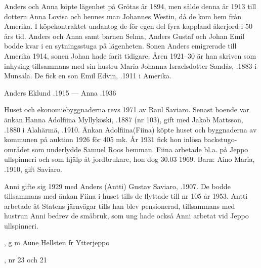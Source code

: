 Anders och Anna köpte lägenhet på Grötas år 1894, men sålde denna år 1913 till dottern Anna Lovisa och hennes man Johannes Westin, då de kom hem från Amerika. I köpekontraktet undantog de för egen del fyra kappland åkerjord i 50 års tid. Anders och Anna samt barnen Selma, Anders Gustaf och Johan Emil bodde kvar i en sytningsstuga på lägenheten. Sonen Anders emigrerade till Amerika 1914, sonen Johan hade farit tidigare. Åren 1921–30 är han skriven som inhysing tillsammans med sin hustru Maria Johanna Israelsdotter Sandås, .1883 i Munsala. De fick en son Emil Edvin, .1911 i Amerika.

Anders Eklund .1915  ---  Anna .1936



%



%
Huset och ekonomiebyggnaderna revs 1971 av Raul Saviaro. Senast boende var änkan Hanna Adolfiina Myllykoski, .1887 (nr 103), gift med Jakob Mattsson, .1880 i Alahärmä, .1910. Änkan Adolfiina(Fiina) köpte huset och byggnaderna av kommunen på auktion 1926 för 405 mk. År 1931 fick hon inlösa backstugo-området som underlydde Samuel Roos hemman. Fiina arbetade bl.a. på Jeppo ullspinneri och som hjälp åt jordbrukare, hon dog 30.03 1969.  Barn:  Aino Maria, .1910, gift Saviaro.


%
Anni gifte sig 1929 med Anders (Antti) Gustav Saviaro, .1907. De bodde tillsammans med änkan Fiina i huset tills de flyttade till nr 105 år 1953. Antti arbetade åt Statens järnvägar tills han blev pensionerad, tillsammans med hustrun Anni bedrev de småbruk, som ung hade också Anni  arbetat vid Jeppo ullspinneri.
\begin{jhchildren}
  \item {}, g m Aune Hellsten fr Ytterjeppo
  \item {}, nr 23 och 21
\end{jhchildren}



